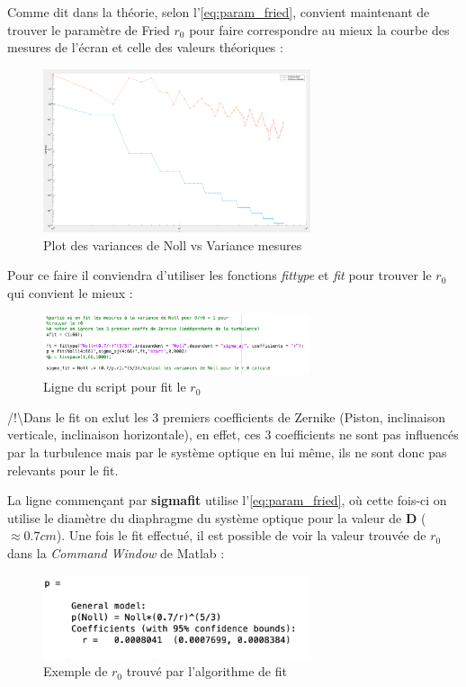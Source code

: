 \newpage
Comme dit dans la théorie, selon l'\autoref{eq:param_fried}, convient maintenant de trouver le paramètre de Fried $r_0$
pour faire correspondre au mieux la courbe des mesures de l'écran et celle des valeurs théoriques :
\begin{figure}[H]
    \centering
    \includegraphics[width = 0.7\textwidth]{assets/figures/mesures/Noll_vs_mesure.png}
    \caption{Plot des variances de Noll vs Variance mesures}
\end{figure}

Pour ce faire il conviendra d'utiliser les fonctions \textit{fittype} et \textit{fit} pour trouver le $r_0$ qui convient le mieux :
\begin{figure}[H]
    \centering
    \includegraphics[width = 0.7\textwidth]{assets/figures/mesures/matlab_fit.png}
    \caption{Ligne du script pour fit le $r_0$}
\end{figure}
\color{red}/!\textbackslash \color{black}Dans le fit on exlut les 3 premiers coefficients de Zernike (Piston, inclinaison verticale, inclinaison horizontale),
en effet, ces 3 coefficients ne sont pas influencés par la turbulence mais par le système optique en lui même, ils ne sont donc pas relevants pour le fit.

La ligne commençant par \textbf{sigma\textunderscore fit} utilise l'\autoref{eq:param_fried}, où cette fois-ci on utilise le diamètre du diaphragme du système optique pour la
valeur de \textbf{D} ($\approx0.7 cm$). Une fois le fit effectué, il est possible de voir la valeur trouvée de $r_0$ dans la \textit{Command Window} de Matlab :
\begin{figure}[H]
    \centering
    \includegraphics[width = 0.7\textwidth]{assets/figures/mesures/fit_r_resultat.png}
    \caption{Exemple de $r_0$ trouvé par l'algorithme de fit}
\end{figure}

